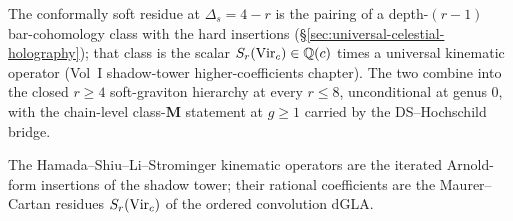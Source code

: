 The conformally soft residue at $\Delta_s = 4 - r$ is the pairing of a
depth-$(r-1)$ bar-cohomology class with the hard insertions
(\S\ref{sec:universal-celestial-holography}); that class is the scalar
$S_r(\mathrm{Vir}_c) \in \mathbb Q(c)$ times a universal kinematic operator (Vol~I
shadow-tower higher-coefficients chapter). The two combine into the
closed $r \geq 4$ soft-graviton hierarchy at every $r \leq 8$,
unconditional at genus $0$, with the chain-level class-$\mathbf M$
statement at $g \geq 1$ carried by the DS--Hochschild bridge.

The Hamada--Shiu--Li--Strominger kinematic operators are the iterated
Arnold-form insertions of the shadow tower; their rational coefficients
are the Maurer--Cartan residues $S_r(\mathrm{Vir}_c)$ of the ordered
convolution dGLA.

